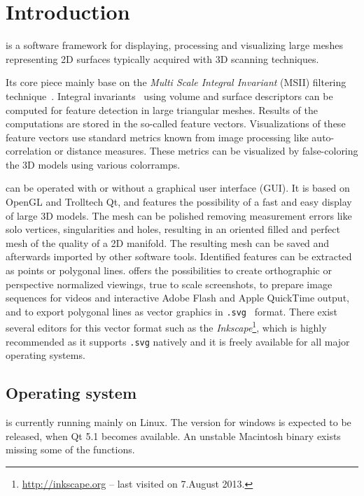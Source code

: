 \chapter{Introduction}
\label{chap:intro}

\GigaMesh is a software framework for displaying, processing and visualizing large meshes representing 2D surfaces typically acquired with 3D scanning techniques.  

Its core piece mainly base on the {\em Multi Scale Integral Invariant} (MSII) filtering technique~\cite{mara12b}.
Integral invariants~\cite{pottmann09a,huang06a} using volume and surface descriptors can be computed for feature detection in large triangular meshes.
Results of the computations are stored in the so-called feature vectors. 
Visualizations of these feature vectors use standard metrics known from image processing like auto-correlation or distance measures.
These metrics can be visualized by false-coloring the 3D models using various colorramps.

\GigaMesh can be operated with or without a graphical user interface (GUI). 
It is based on OpenGL and Trolltech Qt, and features the possibility of a fast and easy display of large 3D models. 
The mesh can be polished  removing measurement errors like solo vertices, singularities and holes, resulting in an oriented filled and perfect mesh of the quality of a 2D manifold. 
The resulting mesh can be saved and afterwards imported by other software tools. Identified features can be extracted as points or polygonal lines.
\GigaMesh offers the possibilities to create orthographic or perspective normalized viewings, 
true to scale screenshots, to prepare image sequences for videos and interactive Adobe Flash and Apple QuickTime output, 
and to export polygonal lines as vector graphics in {\tt *.svg}~\cite{eisenberg02a} format.
There exist several editors for this vector format such as the \emph{Inkscape}\footnote{\url{http://inkscape.org} -- last visited on 7.August 2013.}, 
which is highly recommended as it supports {\tt *.svg} natively and it is freely available for all major operating systems.

\newpage
\section{Operating system}
\GigaMesh is currently running mainly on Linux. 
The version for windows is expected to be released, when Qt 5.1 becomes available. 
An unstable Macintosh binary exists missing some of the functions.


